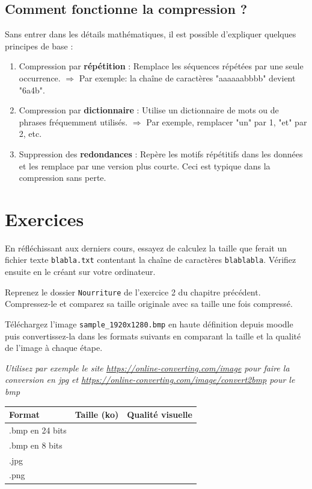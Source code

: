 \documentclass[11pt, a4paper]{book}
\begin{document}
\subsection{Comment fonctionne la compression ?}
 Sans entrer dans les détails mathématiques, il est possible d’expliquer quelques principes de base :
\begin{enumerate}
    \item Compression par \textbf{répétition} :
 Remplace les séquences répétées par une seule occurrence.
$\Rightarrow$ Par exemple: la chaîne de caractères "aaaaaabbbb" devient "6a4b".
    \item Compression par \textbf{dictionnaire} :
 Utilise un dictionnaire de mots ou de phrases fréquemment utilisés.
$\Rightarrow$ Par exemple, remplacer "un" par 1, "et" par 2, etc.
    \item Suppression des \textbf{redondances} :
 Repère les motifs répétitifs dans les données et les remplace par une version plus courte. Ceci est typique dans la compression sans perte.
\end{enumerate}


\section{Exercices}

\begin{exercice}
En réfléchissant aux derniers cours, essayez de calculez la taille que ferait un fichier texte \texttt{blabla.txt} contentant la chaîne de caractères \texttt{blablabla}.
Vérifiez ensuite en le créant sur votre ordinateur.
\end{exercice}


\begin{exercice}
Reprenez le dossier \texttt{Nourriture} de l'exercice 2 du chapitre précédent. Compressez-le et comparez sa taille originale avec sa taille une fois compressé.
\end{exercice}

\begin{exercice}
Téléchargez l'image \texttt{sample\_1920x1280.bmp} en haute définition depuis moodle puis convertissez-la dans les formats suivants en comparant la taille et la qualité de l'image à chaque étape. 

\textit{Utilisez par exemple le site \url{https://online-converting.com/image} pour faire la conversion en jpg et \url{https://online-converting.com/image/convert2bmp} pour le bmp}
\begin{center}
   \begin{tabular}{| l || c | r | }
     \hline
     Format & Taille (ko) & Qualité visuelle \\ \hline
     .bmp en 24 bits &  &  \\ \hline
     .bmp en 8 bits &  &  \\ \hline
     .jpg &  &  \\ \hline
     .png &  &  \\
     \hline
   \end{tabular}
\end{center}
\end{exercice}
\end{document}
